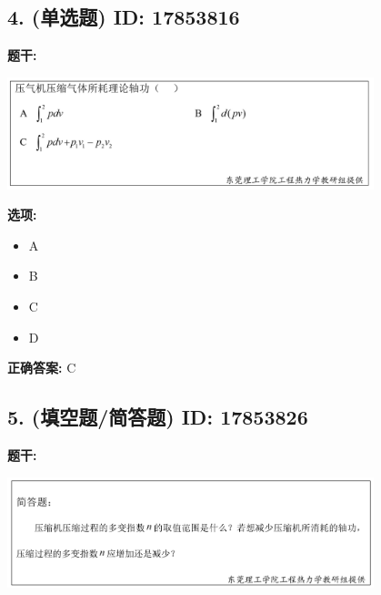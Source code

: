 \documentclass[12pt]{article}
\begin{document}
\vspace{0.5em}\hrulefill\vspace{1em}

\subsection*{4. (单选题) \small ID: 17853816}

\textbf{题干:}


\begin{center}\includegraphics[width=0.8\textwidth, height=0.25\textheight, keepaspectratio]{question_4_17853816/title_img_1.png}\end{center}

\textbf{选项:}
\begin{itemize}[leftmargin=*]
  \item A

  \item B

  \item C

  \item D

\end{itemize}

\textbf{正确答案:}
C

\vspace{0.5em}\hrulefill\vspace{1em}

\subsection*{5. (填空题/简答题) \small ID: 17853826}

\textbf{题干:}


\begin{center}\includegraphics[width=0.8\textwidth, height=0.25\textheight, keepaspectratio]{question_5_17853826/title_img_1.png}\end{center}
\end{document}
